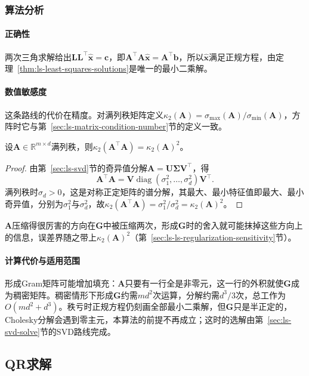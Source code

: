 \subsubsection{算法分析}

\paragraph{正确性}
两次三角求解给出$\bm L\bm L^\top\hat{\bm x}=\bm c$，即$\bm A^\top\bm A\hat{\bm x}=\bm A^\top\bm b$，所以$\hat{\bm x}$满足正规方程，由定理~\ref{thm:ls-least-squares-solutions}是唯一的最小二乘解。

\paragraph{数值敏感度}
这条路线的代价在精度。对满列秩矩阵定义$\kappa_2(\bm A)=\sigma_{\max}(\bm A)/\sigma_{\min}(\bm A)$，方阵时它与第~\ref{sec:ls-matrix-condition-number}节的定义一致。

\begin{theorem}[正规方程使条件数平方]
\label{thm:ls-normal-equations-condition-squaring}
设$\bm A\in\mathbb R^{m\times d}$满列秩，则$\kappa_2(\bm A^\top\bm A)=\kappa_2(\bm A)^2$。
\end{theorem}
\begin{proof}
由第~\ref{sec:ls-svd}节的奇异值分解$\bm A=\bm U\bm\Sigma\bm V^\top$，得
\[
 \bm A^\top\bm A=\bm V\operatorname{diag}(\sigma_1^2,\ldots,\sigma_d^2)\bm V^\top .
\]
满列秩时$\sigma_d>0$，这是对称正定矩阵的谱分解，其最大、最小特征值即最大、最小奇异值，分别为$\sigma_1^2$与$\sigma_d^2$，故$\kappa_2(\bm A^\top\bm A)=\sigma_1^2/\sigma_d^2=\kappa_2(\bm A)^2$。
\end{proof}

$\bm A$压缩得很厉害的方向在$\bm G$中被压缩两次，形成$\bm G$时的舍入就可能抹掉这些方向上的信息，误差界随之带上$\kappa_2(\bm A)^2$（第~\ref{sec:ls-ls-regularization-sensitivity}节）。

\paragraph{计算代价与适用范围}
形成Gram矩阵可能增加填充：$\bm A$只要有一行全是非零元，这一行的外积就使$\bm G$成为稠密矩阵。稠密情形下形成$\bm G$约需$md^2$次运算，分解约需$d^3/3$次，总工作为$O(md^2+d^3)$。秩亏时正规方程仍刻画全部最小二乘解，但$\bm G$只是半正定的，Cholesky分解会遇到零主元，本算法的前提不再成立；这时的选解由第~\ref{sec:ls-svd-solve}节的SVD路线完成。

\subsection{QR求解}
\label{sec:ls-qr-method}

